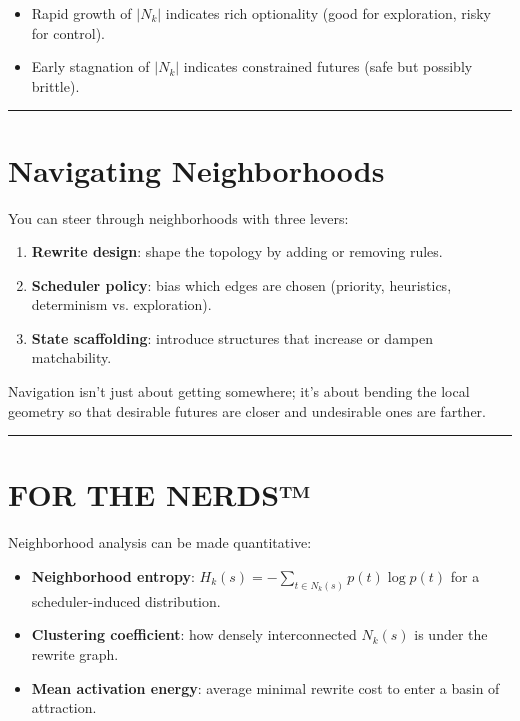 \begin{itemize}
    \item Rapid growth of $|N_k|$ indicates rich optionality (good for exploration, risky for control).
    \item Early stagnation of $|N_k|$ indicates constrained futures (safe but possibly brittle).
\end{itemize}

\begin{center}\rule{0.5\linewidth}{0.5pt}\end{center}

\section{Navigating Neighborhoods}
\label{7.5-navigating-neighborhoods}

You can steer through neighborhoods with three levers:

\begin{enumerate}
    \item \textbf{Rewrite design}: shape the topology by adding or removing rules.
    \item \textbf{Scheduler policy}: bias which edges are chosen (priority, heuristics, determinism vs. exploration).
    \item \textbf{State scaffolding}: introduce structures that increase or dampen matchability.
\end{enumerate}

Navigation isn’t just about getting somewhere; it’s about bending the local geometry so that desirable futures are closer and undesirable ones are farther.

\begin{center}\rule{0.5\linewidth}{0.5pt}\end{center}

\section*{FOR THE NERDS™}

Neighborhood analysis can be made quantitative:

\begin{itemize}
    \item \textbf{Neighborhood entropy}: $H_k(s) = -\sum_{t \in N_k(s)} p(t) \log p(t)$ for a scheduler-induced distribution.
    \item \textbf{Clustering coefficient}: how densely interconnected $N_k(s)$ is under the rewrite graph.
    \item \textbf{Mean activation energy}: average minimal rewrite cost to enter a basin of attraction.
\end{itemize}

